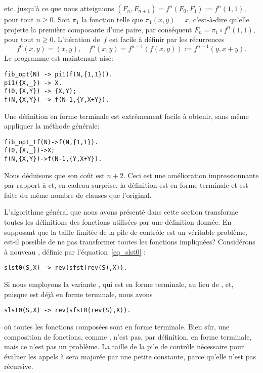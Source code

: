 etc. jusqu'à ce que nous atteignions \((F_{n},F_{n+1}) = f^n(F_0,F_1)
:= f^{n}(1,1)\), pour tout \(n \geqslant 0\). Soit \(\pi_1\) la
fonction telle que \(\pi_1(x,y) = x\), c'est-à-dire qu'elle projette
la première composante d'une paire, par conséquent \(F_n = \pi_1 \circ
f^n(1,1)\), pour tout \(n \geqslant 0\). L'itération de~\(f\) est
facile à définir par les récurrences
\begin{equation*}
f^0(x,y) = (x,y),\quad
f^n(x,y) = f^{n-1}(f(x,y)) := f^{n-1}(y,x+y).
\end{equation*}
Le programme \Erlang est maintenant aisé:
\begin{verbatim}
fib_opt(N) -> pi1(f(N,{1,1})).
pi1({X,_}) -> X.
f(0,{X,Y}) -> {X,Y};
f(N,{X,Y}) -> f(N-1,{Y,X+Y}).
\end{verbatim}
Une définition en forme terminale est extrêmement facile à obtenir,
sans même appliquer la méthode générale:
\begin{alltt}
fib\_opt\_tf(N) -> f(N,\{1,1\}).
f(0,\{X,\_\})    -> X;\hfill% \emph{Projection ici}
f(N,\{X,Y\})    -> f(N-1,\{Y,X+Y\}).
\end{alltt}
Nous déduisons que son coût est \(n + 2\). Ceci est une amélioration
impressionnante par rapport à  et, en cadeau surprise,
la définition est en forme terminale et est faite du même nombre de
clauses que l'original.

L'algorithme général que nous avons présenté dans cette section
transforme toutes les définitions des fonctions utilisées par une
définition donnée. En supposant que la taille limitée de la pile de
contrôle est un véritable problème, est-il possible de ne pas
transformer toutes les fonctions impliquées? Considérons à nouveau
, définie par l'équation~\eqref{eq_slst0}
:
\begin{verbatim}
slst0(S,X) -> rev(sfst(rev(S),X)).
\end{verbatim}
Si nous employons la variante , qui est en forme
terminale, au lieu de , et, puisque 
est déjà en forme terminale, nous avons
\begin{verbatim}
slst0(S,X) -> rev(sfst0(rev(S),X)).
\end{verbatim}
où toutes les fonctions composées sont en forme terminale. Bien sûr,
une composition de fonctions, comme , n'est pas, par
définition, en forme terminale, mais ce n'est pas un problème. La
taille de la pile de contrôle nécessaire pour évaluer les appels à
 sera majorée par une petite constante, parce qu'elle
n'est pas récursive.


